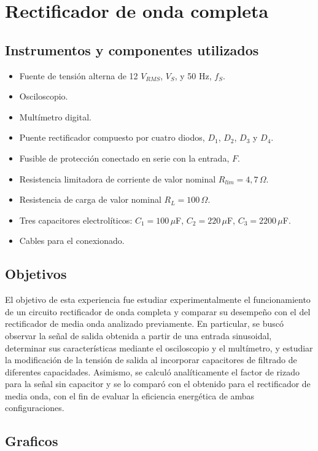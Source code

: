 \section{Rectificador de onda completa}

\subsection{Instrumentos y componentes utilizados}

\begin{itemize}
    \item Fuente de tensión alterna de 12 $V_{RMS}$, $V_S$, y 50 Hz, $f_S$.
    \item Osciloscopio.
    \item Multímetro digital.
    \item Puente rectificador compuesto por cuatro diodos, $D_1$, $D_2$, $D_3$ y $D_4$.
    \item Fusible de protección conectado en serie con la entrada, $F$.
    \item Resistencia limitadora de corriente de valor nominal $R_{lím} = 4{,}7\,\Omega$.
    \item Resistencia de carga de valor nominal $R_L = 100\,\Omega$.
    \item Tres capacitores electrolíticos: $C_1 = 100\,\mu$F, $C_2 = 220\,\mu$F, $C_3 = 2200\,\mu$F.
    \item Cables para el conexionado.
\end{itemize}


\subsection{Objetivos}

El objetivo de esta experiencia fue estudiar experimentalmente el funcionamiento de un circuito rectificador de onda completa y comparar su desempeño con el del rectificador de media onda analizado previamente. En particular, se buscó observar la señal de salida obtenida a partir de una entrada sinusoidal, determinar sus características mediante el osciloscopio y el multímetro, y estudiar la modificación de la tensión de salida al incorporar capacitores de filtrado de diferentes capacidades. Asimismo, se calculó analíticamente el factor de rizado para la señal sin capacitor y se lo comparó con el obtenido para el rectificador de media onda, con el fin de evaluar la eficiencia energética de ambas configuraciones.


\subsection{Graficos}

